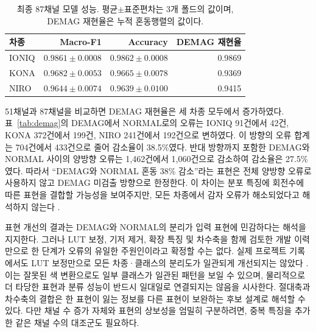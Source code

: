 \documentclass[11pt,a4paper]{article}
\newcommand{\sourceproject}{\citep{project2026}}
\begin{document}
\begin{table}[htbp]
\centering
\caption{최종 87채널 모델 성능. 평균$\pm$표준편차는 3개 폴드의 값이며, DEMAG 재현율은 누적 혼동행렬의 값이다.}
\label{tab:final}
\begingroup\small\setlength{\tabcolsep}{5pt}
\begin{tabular}{lrrr}
\toprule
차종 & Macro-F1 & Accuracy & DEMAG 재현율 \\
\midrule
IONIQ & $0.9861\pm0.0008$ & $0.9862\pm0.0008$ & 0.9869 \\
KONA & $0.9682\pm0.0053$ & $0.9665\pm0.0078$ & 0.9369 \\
NIRO & $0.9644\pm0.0074$ & $0.9639\pm0.0100$ & 0.9415 \\
\bottomrule
\end{tabular}
\endgroup
\end{table}

51채널과 87채널을 비교하면 DEMAG 재현율은 세 차종 모두에서 증가하였다.
표~\ref{tab:demag}의 DEMAG에서 NORMAL로의 오류는 IONIQ 91건에서 42건, KONA 372건에서 199건, NIRO 241건에서 192건으로 변하였다.
이 방향의 오류 합계는 704건에서 433건으로 줄어 감소율이 38.5\%였다.
반대 방향까지 포함한 DEMAG와 NORMAL 사이의 양방향 오류는 1,462건에서 1,060건으로 감소하여 감소율은 27.5\%였다.
따라서 ``DEMAG와 NORMAL 혼동 38\% 감소''라는 표현은 전체 양방향 오류로 사용하지 않고 DEMAG 미검출 방향으로 한정한다.
이 차이는 분포 특징에 회전수에 따른 표현을 결합할 가능성을 보여주지만, 모든 차종에서 감자 오류가 해소되었다고 해석하지 않는다 \sourceproject.

\begin{table}[htbp]
\centering
\caption{51채널에서 87채널로의 DEMAG 재현율과 두 방향 오류 변화. $D$는 DEMAG, $N$은 NORMAL이며 pp는 퍼센트포인트이다.}
\label{tab:demag}
\end{table}

표현 개선의 결과는 DEMAG와 NORMAL의 분리가 입력 표현에 민감하다는 해석을 지지한다.
그러나 LUT 보정, 기저 제거, 확장 특징 및 차수축을 함께 검토한 개발 이력만으로 한 단계가 오류의 유일한 주원인이라고 확정할 수는 없다.
실제 프로젝트 기록에서도 LUT 보정만으로 모든 차종·클래스의 분리도가 일관되게 개선되지는 않았다 \sourceproject.
이는 잘못된 색 변환으로도 일부 클래스가 일관된 패턴을 보일 수 있으며, 물리적으로 더 타당한 표현과 분류 성능이 반드시 일대일로 연결되지는 않음을 시사한다.
절대축과 차수축의 결합은 한 표현이 잃는 정보를 다른 표현이 보완하는 후보 설계로 해석할 수 있다.
다만 채널 수 증가 자체와 표현의 상보성을 엄밀히 구분하려면, 중복 특징을 추가한 같은 채널 수의 대조군도 필요하다.
\end{document}
